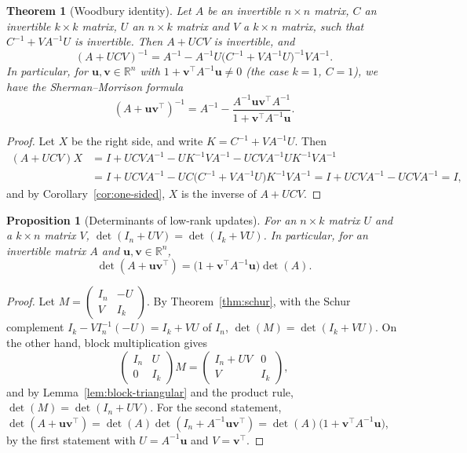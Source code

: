 \documentclass[11pt]{article}
\theoremstyle{definition}
\theoremstyle{plain}
\newtheorem{theorem}[definition]{Theorem}
\newtheorem{proposition}[definition]{Proposition}
\theoremstyle{remark}
\begin{document}
\begin{theorem}[Woodbury identity]\label{thm:woodbury}
    Let $A$ be an invertible $n \times n$ matrix, $C$ an invertible $k \times k$ matrix, $U$ an $n \times k$ matrix and $V$ a $k \times n$ matrix, such that $C^{-1} + VA^{-1}U$ is invertible. Then $A + UCV$ is invertible, and
    \[(A + UCV)^{-1} = A^{-1} - A^{-1}U\big(C^{-1} + VA^{-1}U\big)^{-1}VA^{-1}.\]
    In particular, for $\mathbf{u}, \mathbf{v} \in \mathbb{R}^n$ with $1 + \mathbf{v}^\top A^{-1}\mathbf{u} \neq 0$ (the case $k = 1$, $C = 1$), we have the Sherman--Morrison formula
    \[(A + \mathbf{u}\mathbf{v}^\top)^{-1} = A^{-1} - \frac{A^{-1}\mathbf{u}\mathbf{v}^\top A^{-1}}{1 + \mathbf{v}^\top A^{-1}\mathbf{u}}.\]
\end{theorem}

\begin{proof}
    Let $X$ be the right side, and write $K = C^{-1} + VA^{-1}U$. Then
    \begin{align*}
        (A + UCV)X &= I + UCVA^{-1} - UK^{-1}VA^{-1} - UCVA^{-1}UK^{-1}VA^{-1} \\
        &= I + UCVA^{-1} - UC\big(C^{-1} + VA^{-1}U\big)K^{-1}VA^{-1} = I + UCVA^{-1} - UCVA^{-1} = I,
    \end{align*}
    and by Corollary~\ref{cor:one-sided}, $X$ is the inverse of $A + UCV$.
\end{proof}

\begin{proposition}[Determinants of low-rank updates]\label{prop:det-lemma}
    For an $n \times k$ matrix $U$ and a $k \times n$ matrix $V$, $\det(I_n + UV) = \det(I_k + VU)$. In particular, for an invertible matrix $A$ and $\mathbf{u}, \mathbf{v} \in \mathbb{R}^n$,
    \[\det(A + \mathbf{u}\mathbf{v}^\top) = \big(1 + \mathbf{v}^\top A^{-1}\mathbf{u}\big)\det(A).\]
\end{proposition}

\begin{proof}
    Let $M = \begin{pmatrix} I_n & -U \\ V & I_k \end{pmatrix}$. By Theorem~\ref{thm:schur}, with the Schur complement $I_k - VI_n^{-1}(-U) = I_k + VU$ of $I_n$, $\det(M) = \det(I_k + VU)$. On the other hand, block multiplication gives
    \[\begin{pmatrix} I_n & U \\ 0 & I_k \end{pmatrix}M = \begin{pmatrix} I_n + UV & 0 \\ V & I_k \end{pmatrix},\]
    and by Lemma~\ref{lem:block-triangular} and the product rule, $\det(M) = \det(I_n + UV)$. For the second statement, $\det(A + \mathbf{u}\mathbf{v}^\top) = \det(A)\det(I_n + A^{-1}\mathbf{u}\mathbf{v}^\top) = \det(A)\big(1 + \mathbf{v}^\top A^{-1}\mathbf{u}\big)$, by the first statement with $U = A^{-1}\mathbf{u}$ and $V = \mathbf{v}^\top$.
\end{proof}
\end{document}
